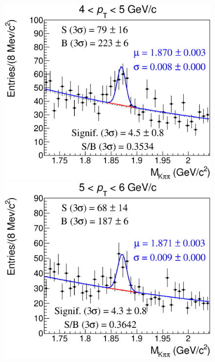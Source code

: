 \documentclass[b5paper,10pt,twoside,oldstyle,classica]{toptesi}
\begin{document}
\begin{figure}[h]
\begin{center}
{\includegraphics[scale = 0.25]{MassFitSet3_Pt2.eps}}
\hspace{0cm}
{\includegraphics[scale = 0.25]{MassFitSet3_Pt3.eps}}
\vspace{0cm}

\end{center}
\end{figure}
\end{document}
